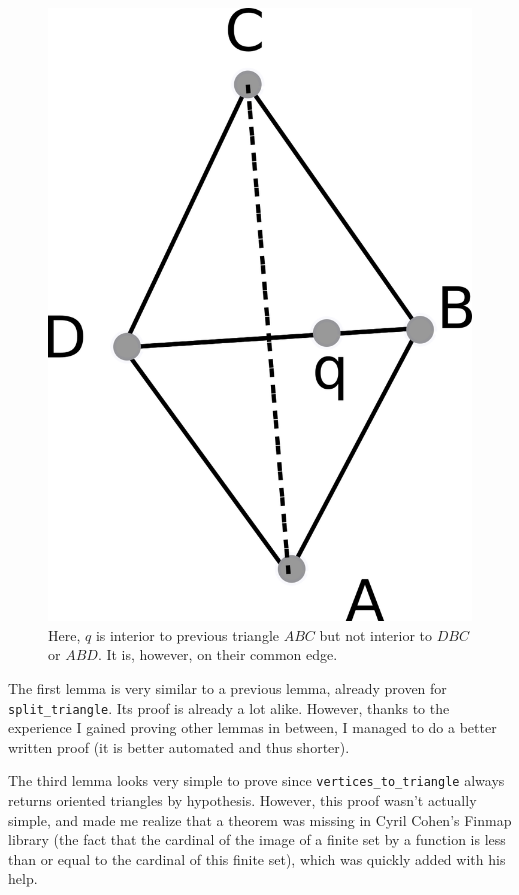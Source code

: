 \documentclass[a4paper,10pt]{article}
\begin{document}
\begin{figure}
  \centering
  \includegraphics[scale=2]{flip_edge_nci}
    \caption{\label{fenci} Here, $q$ is interior to previous triangle $ABC$ but not interior to $DBC$ or $ABD$. It is, however, on their common edge.}
\end{figure}


The first lemma is very similar to a previous lemma, already proven for {\tt split\_triangle}. Its proof is already a lot alike. However, thanks to the experience I gained proving other lemmas in between, I managed to do a better written proof (it is better automated and thus shorter).

The third lemma looks very simple to prove since {\tt vertices\_to\_triangle} always returns oriented triangles by hypothesis. However, this proof wasn't actually simple, and made me realize that a theorem was missing in Cyril Cohen's {\sc Finmap} library \cite{finmap} (the fact that the cardinal of the image of a finite set by a function is less than or equal to the cardinal of this finite set), which was quickly added with his help.
\end{document}
